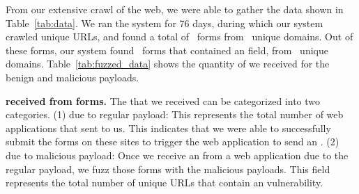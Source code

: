 From our extensive crawl of the web, we were able to gather the data
shown in Table~\ref{tab:data}. We ran the system for 76 days, during which our system crawled \urls unique URLs,
and found a total of \forms\ forms from \uniqueforms\ unique domains. Out of these forms, our system
found \emailforms\ forms that contained an \email field, from \uniqueemailforms\ unique domains.
Table~\ref{tab:fuzzed_data} shows the quantity of \emails we received for the benign and malicious payloads. 



\noindent\textbf{\Email received from forms.} The \emails that we
received can be categorized into two categories. (1) \Emails due to
regular payload: This represents the total number of web applications
that sent \emails to us. This indicates that we were able to
successfully submit the forms on these sites to trigger the web
application to send an \email. (2) \Emails due to malicious payload:
Once we receive an \email from a web application due to the regular
payload, we fuzz those forms with the malicious payloads. This field
represents the total number of unique URLs that contain an \ehi
vulnerability.

